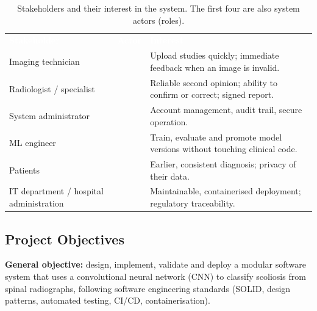 \documentclass[12pt,a4paper]{article}
\newcommand{\yes}{\textcolor{verdeUAEM}{\ding{51}}}
\newcommand{\no}{\textcolor{red!70!black}{\ding{55}}}
\newcommand{\hd}[1]{\textcolor{white}{\textbf{#1}}}
\begin{document}
\begin{table}[H]
\centering
\caption{Stakeholders and their interest in the system. The first four are also system actors (roles).}
\label{tab:stakeholders}
\renewcommand{\arraystretch}{1.3}
\begin{tabularx}{\textwidth}{L{3.6cm} C{1.4cm} Y}
\hd{Stakeholder} & \hd{Actor} & \hd{Interest} \\
Imaging technician & \yes & Upload studies quickly; immediate feedback when an image is invalid. \\
Radiologist / specialist & \yes & Reliable second opinion; ability to confirm or correct; signed report. \\
System administrator & \yes & Account management, audit trail, secure operation. \\
ML engineer & \yes & Train, evaluate and promote model versions without touching clinical code. \\
Patients & \no & Earlier, consistent diagnosis; privacy of their data. \\
IT department / hospital administration & \no & Maintainable, containerised deployment; regulatory traceability. \\
\end{tabularx}
\end{table}

\subsection{Project Objectives}

\textbf{General objective:} design, implement, validate and deploy a modular software system that uses
a convolutional neural network (CNN) to classify scoliosis from spinal radiographs, following software
engineering standards (SOLID, design patterns, automated testing, CI/CD, containerisation).
\end{document}

